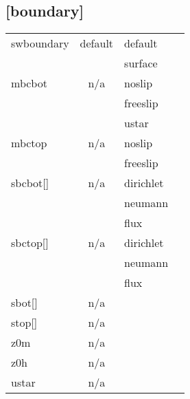 \documentclass[a4paper,10pt]{extarticle}
\begin{document}
\subsection*{[boundary]}
\tablelasttail{\hline}
\begin{supertabular}{lcll}
swboundary    & default & default & \\
              &         & surface & \\
mbcbot        & n/a     & noslip \\
              &         & freeslip \\
              &         & ustar \\
mbctop        & n/a     & noslip \\
              &         & freeslip \\
sbcbot[]      & n/a     & dirichlet \\
              &         & neumann \\
              &         & flux \\
sbctop[]      & n/a     & dirichlet \\
              &         & neumann \\
              &         & flux \\
sbot[]        & n/a     & \\
stop[]        & n/a     & \\
z0m           & n/a     & \\
z0h           & n/a     & \\
ustar         & n/a     & \\
\end{supertabular}
\end{document}
